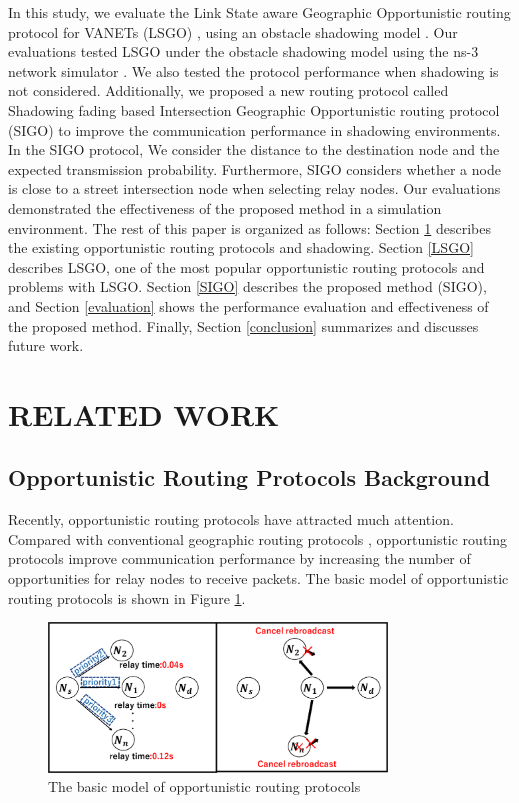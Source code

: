 \documentclass[conference]{IEEEtran}
\begin{document}
In this study, we evaluate the Link State aware Geographic Opportunistic
routing protocol for VANETs (LSGO) \cite{18}, using an obstacle shadowing model \cite{20}. 
Our evaluations tested LSGO under the obstacle shadowing model \cite{20} using the ns-3 network simulator \cite{19}. 
We also tested the protocol performance when shadowing is not considered.
Additionally, we proposed a new routing protocol called Shadowing fading based Intersection Geographic Opportunistic routing protocol (SIGO) to improve the communication performance in shadowing environments.
In the SIGO protocol, We consider the distance to the destination node and the expected transmission probability. Furthermore, SIGO considers whether a node is close to a street intersection node  when selecting relay nodes.
Our evaluations demonstrated the effectiveness of the proposed method in a simulation environment. 
The rest of this paper is organized as follows:
Section \ref{relatedSection} describes the existing opportunistic routing protocols and shadowing. 
Section \ref{LSGO} describes LSGO, one of the most popular opportunistic routing protocols and problems with LSGO. 
Section \ref{SIGO} describes the proposed method (SIGO), and Section \ref{evaluation} shows the performance evaluation and effectiveness of the proposed method. Finally, Section \ref{conclusion} summarizes and discusses future work.

\section{RELATED WORK}
\label{relatedSection}

\subsection{Opportunistic Routing Protocols Background}

Recently, opportunistic routing protocols have attracted much attention. Compared with conventional geographic routing protocols \cite{6}, opportunistic routing protocols improve communication performance by increasing the number of opportunities for relay nodes to receive packets. The basic model of opportunistic routing protocols is shown in Figure \ref{fig:Basic}.

\begin{figure}[!ht]
\centering
\includegraphics[width=90mm]{figures/basic-opportunity2.eps}
\caption{The basic model of opportunistic routing protocols}
\label{fig:Basic}
\end{figure}
\end{document}
